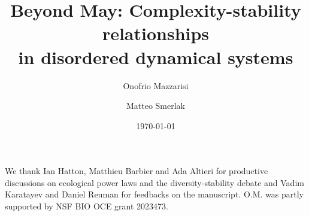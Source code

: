 \documentclass[
 prl,
 twocolumn,
 amsmath,
 amssymb,
 aps,
]{revtex4-2}
\begin{document}
\title{Beyond May: Complexity-stability relationships \\
in disordered dynamical systems}

\author{Onofrio Mazzarisi}

\author{Matteo Smerlak}


\date{\today}

\begin{abstract}

\end{abstract}
\maketitle

\paragraph*{}


\paragraph*{}


\paragraph*{}


\paragraph*{}


\paragraph*{}


\paragraph*{}


\medskip

\begin{acknowledgments}
We thank Ian Hatton, Matthieu Barbier and Ada Altieri for productive discussions on ecological power laws and the diversity-stability debate and Vadim Karatayev and Daniel Reuman for feedbacks on the manuscript.
O.M. was partly supported by NSF BIO OCE grant 2023473.
\end{acknowledgments}

\medskip



\end{document}
